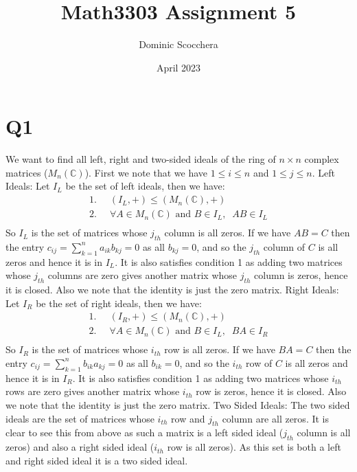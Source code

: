 \documentclass{article}
\title{Math3303 Assignment 5}
\author{Dominic Scocchera}
\date{April 2023}
\theoremstyle{definition}
\begin{document}
\maketitle
\section*{Q1}
We want to find all left, right and two-sided ideals of the ring of $n \times n$ complex matrices ($M_n(\mathbb{C})$). First we note that we have $1\leq i\leq n$ and $1\leq j\leq n$.
\newline\newline
Left Ideals:
\newline
Let $I_L$ be the set of left ideals, then we have:
\begin{align*}
1.\;\;&(I_L,+)\leq(M_n(\mathbb{C}),+)\\
2.\;\;&\forall A\in M_n(\mathbb{C})\text{ and } B\in I_L,\;\; AB\in I_L\\
\end{align*}
So $I_L$ is the set of matrices whose $j_{th}$ column is all zeros. If we have $AB=C$ then the entry $c_{ij}=\sum_{k=1}^{n}a_{ik}b_{kj}=0$ as all $b_{kj}=0$, and so the $j_{th}$ column of $C$ is all zeros and hence it is in $I_L$. It is also satisfies condition 1 as adding two matrices whose $j_{th}$ columns are zero gives another matrix whose $j_{th}$ column is zeros, hence it is closed. Also we note that the identity is just the zero matrix.
\newline\newline
Right Ideals:
\newline
Let $I_R$ be the set of right ideals, then we have:
\begin{align*}
1.\;\;&(I_R,+)\leq(M_n(\mathbb{C}),+)\\
2.\;\;&\forall A\in M_n(\mathbb{C})\text{ and } B\in I_L,\;\; BA\in I_R\\
\end{align*}
So $I_R$ is the set of matrices whose $i_{th}$ row is all zeros. If we have $BA=C$ then the entry $c_{ij}=\sum_{k=1}^{n}b_{ik}a_{kj}=0$ as all $b_{ik}=0$, and so the $i_{th}$ row of $C$ is all zeros and hence it is in $I_R$. It is also satisfies condition 1 as adding two matrices whose $i_{th}$ rows are zero gives another matrix whose $i_{th}$ row is zeros, hence it is closed. Also we note that the identity is just the zero matrix.
\newline\newline
Two Sided Ideals:
\newline
The two sided ideals are the set of matrices whose $i_{th}$ row and $j_{th}$ column are all zeros. It is clear to see this from above as such a matrix is a left sided ideal ($j_{th}$ column is all zeros) and also a right sided ideal ($i_{th}$ row is all zeros). As this set is both a left and right sided ideal it is a two sided ideal.
\end{document}
